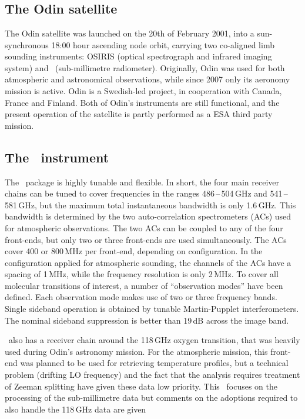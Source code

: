 \section{\smr}
\label{sec:smr}
%
\subsection{The Odin satellite}
\label{sec:odin}
%
The Odin satellite was launched on the 20th of February 2001, into a sun-synchronous
18:00 hour ascending node orbit, carrying two co-aligned limb sounding
instruments: OSIRIS (optical spectrograph and infrared imaging system) and
\SMR\ (sub-millimetre radiometer). Originally, Odin was used for both
atmospheric and astronomical observations, while since 2007 only its aeronomy
mission is active. Odin is a Swedish-led project, in cooperation with Canada,
France and Finland. Both of Odin's instruments are still functional, and the
present operation of the satellite is partly performed as a ESA third party
mission.


\subsection{The \SMR\ instrument}
\label{sec:smr:details}
%
The \smr\ package is highly tunable and flexible. In short, the four main
receiver chains can be tuned to cover frequencies in the ranges
486\,--\,504\,GHz and 541\,--\,581\,GHz, but the maximum total instantaneous
bandwidth is only 1.6\,GHz. This bandwidth is determined by the two
auto-correlation spectrometers (ACs) used for atmospheric observations. The two
ACs can be coupled to any of the four front-ends, but only two or three
front-ends are used simultaneously. The ACs cover 400 or 800\,MHz per
front-end, depending on configuration. In the configuration applied for
atmospheric sounding, the channels of the ACs have a spacing of 1\,MHz, while
the frequency resolution is only 2\,MHz. To
cover all molecular transitions of interest, a number of ``observation modes''
have been defined. Each observation mode makes use of two or three frequency
bands. Single sideband operation is obtained by tunable Martin-Pupplet
interferometers. The nominal sideband suppression is better than 19\,dB across
the image band.

\smr\ also has a receiver chain around the 118\,GHz oxygen transition, that was
heavily used during Odin's astronomy mission. For the atmospheric mission, this
front-end was planned to be used for retrieving temperature profiles, but a
technical problem (drifting LO frequency) and the fact that the analysis
requires treatment of Zeeman splitting have given these data low priority. This
\ATBD\ focuses on the processing of the sub-millimetre data but comments on the
adoptions required to also handle the 118\,GHz data are given

